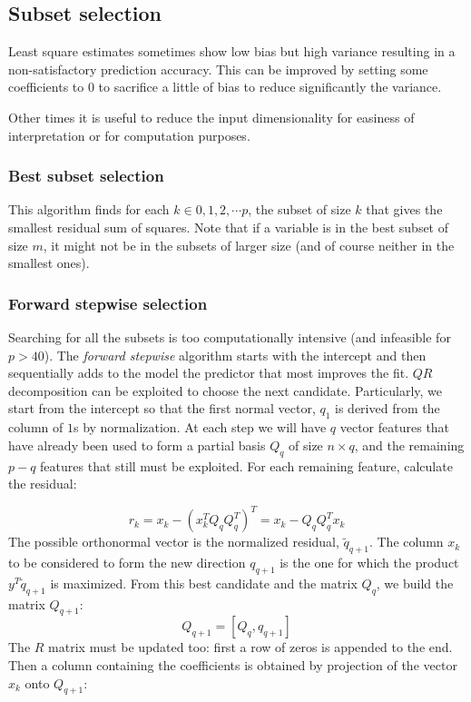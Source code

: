 \subsection{Subset selection}
Least square estimates sometimes show low bias but high variance resulting in a non-satisfactory prediction accuracy. This can be improved by setting some coefficients to $0$ to sacrifice a little of bias to reduce significantly the variance.

Other times it is useful to reduce the input dimensionality for easiness of interpretation or for computation purposes.

\subsubsection{Best subset selection}
This algorithm finds for each $k \in {0,1,2,	\cdots p}$, the subset of size $k$ that gives the smallest residual sum of squares. Note that if a variable is in the best subset of size $m$, it might not be in the subsets of larger size (and of course neither in the smallest ones).

\subsubsection{Forward stepwise selection}
Searching for all the subsets is too computationally intensive (and infeasible for $p>40$). The \textit{forward stepwise} algorithm starts with the intercept and then sequentially adds to the model the predictor that most improves the fit. $QR$ decomposition can be exploited to choose the next candidate. Particularly, we start from the intercept so that the first normal vector, $q_1$ is derived from the column of $1$s by normalization. At each step we will have $q$ vector features that have already been used to form a partial basis $Q_q$ of size $n\times q$, and the remaining $p-q$ features that still must be exploited. For each remaining feature, calculate the residual:

\begin{equation}
r_k  = x_k - \left(x_k^T Q_qQ_q^T\right)^T = x_k - Q_qQ_q^Tx_k
\end{equation}
The possible orthonormal vector is the normalized residual, $\tilde{q}_{q+1}$. The column $x_k$ to be considered to form the new direction $q_{q+1}$ is the one for which the product $y^T \tilde{q}_{q+1}$ is maximized. From this best candidate and the matrix $Q_{q}$, we build the matrix $Q_{q+1}$:
\begin{equation}
Q_{q+1} = \left[Q_{q}, q_{q+1}\right]
\end{equation}
The $R$ matrix must be updated too: first a row of zeros is appended to the end. Then a column containing the coefficients is obtained by projection of the vector $x_k$ onto $Q_{q+1}$:

